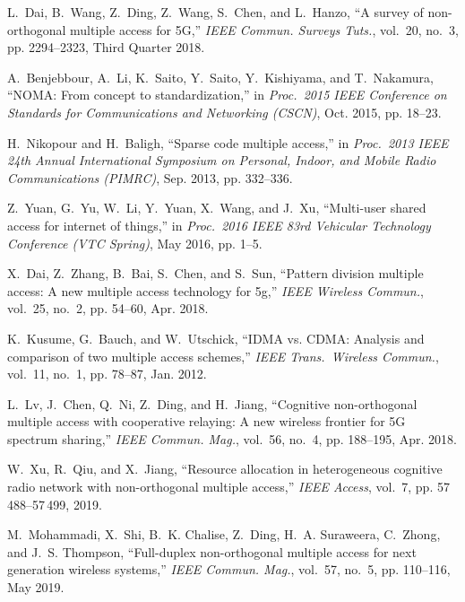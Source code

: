\begin{multicols}{2}
\begin{thebibliography}{99}
L.~{Dai}, B.~{Wang}, Z.~{Ding}, Z.~{Wang}, S.~{Chen}, and L.~{Hanzo}, ``A
  survey of non-orthogonal multiple access for {5G},'' \emph{{IEEE} Commun.
  Surveys Tuts.}, vol.~20, no.~3, pp. 2294--2323, Third Quarter 2018.

A.~{Benjebbour}, A.~{Li}, K.~{Saito}, Y.~{Saito}, Y.~{Kishiyama}, and
  T.~{Nakamura}, ``{NOMA}: {F}rom concept to standardization,'' in
  \emph{Proc.~2015 IEEE Conference on Standards for Communications and
  Networking {(CSCN)}}, Oct. 2015, pp. 18--23.

H.~{Nikopour} and H.~{Baligh}, ``Sparse code multiple access,'' in
  \emph{Proc.~2013 IEEE 24th Annual International Symposium on Personal,
  Indoor, and Mobile Radio Communications {(PIMRC)}}, Sep. 2013, pp. 332--336.

Z.~{Yuan}, G.~{Yu}, W.~{Li}, Y.~{Yuan}, X.~{Wang}, and J.~{Xu}, ``Multi-user
  shared access for internet of things,'' in \emph{Proc.~2016 IEEE 83rd
  Vehicular Technology Conference ({VTC} Spring)}, May 2016, pp. 1--5.

X.~{Dai}, Z.~{Zhang}, B.~{Bai}, S.~{Chen}, and S.~{Sun}, ``Pattern division
  multiple access: A new multiple access technology for 5g,'' \emph{{IEEE
  Wireless Commun.}}, vol.~25, no.~2, pp. 54--60, Apr. 2018.

K.~{Kusume}, G.~{Bauch}, and W.~{Utschick}, ``{IDMA vs. CDMA}: {A}nalysis and
  comparison of two multiple access schemes,'' \emph{IEEE Trans.\ Wireless
  Commun.}, vol.~11, no.~1, pp. 78--87, Jan. 2012.

L.~{Lv}, J.~{Chen}, Q.~{Ni}, Z.~{Ding}, and H.~{Jiang}, ``Cognitive
  non-orthogonal multiple access with cooperative relaying: {A} new wireless
  frontier for {5G} spectrum sharing,'' \emph{{IEEE} Commun. Mag.}, vol.~56,
  no.~4, pp. 188--195, Apr. 2018.

W.~{Xu}, R.~{Qiu}, and X.~{Jiang}, ``Resource allocation in heterogeneous
  cognitive radio network with non-orthogonal multiple access,'' \emph{IEEE
  Access}, vol.~7, pp. 57\,488--57\,499, 2019.

M.~{Mohammadi}, X.~{Shi}, B.~K. {Chalise}, Z.~{Ding}, H.~A. {Suraweera},
  C.~{Zhong}, and J.~S. {Thompson}, ``Full-duplex non-orthogonal multiple
  access for next generation wireless systems,'' \emph{{IEEE} Commun. Mag.},
  vol.~57, no.~5, pp. 110--116, May 2019.


\end{thebibliography}
\end{multicols}

